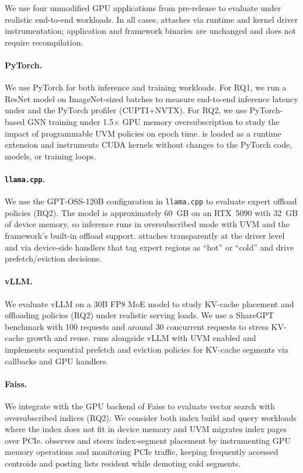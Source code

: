 We use four unmodified GPU applications from pre-release to evaluate \sys under realistic
end-to-end workloads. In all cases, \sys attaches via runtime and kernel driver
instrumentation; application and framework binaries are unchanged and does not require recompilation.

\paragraph{PyTorch.}
We use PyTorch for both inference and training workloads. For RQ1, we run a
ResNet model on ImageNet-sized batches to measure end-to-end inference latency
under \sys and the PyTorch profiler (CUPTI+NVTX). For RQ2, we use PyTorch-based
GNN training under 1.5$\times$ GPU memory oversubscription to study the impact
of programmable UVM policies on epoch time. \sys is loaded as a runtime
extension and instruments CUDA kernels without changes to the PyTorch code,
models, or training loops.

\paragraph{\texttt{llama.cpp}.}
We use the GPT-OSS-120B configuration in \texttt{llama.cpp} to evaluate expert
offload policies (RQ2). The model is approximately 60~GB on an RTX~5090 with
32~GB of device memory, so inference runs in oversubscribed mode with UVM and
the framework's built-in offload support. \sys attaches
transparently at the driver level and
via device-side handlers that tag expert regions as ``hot'' or ``cold'' and
drive prefetch/eviction decisions.

\paragraph{vLLM.}
We evaluate vLLM on a 30B FP8 MoE model to study KV-cache placement and
offloading policies (RQ2) under realistic serving loads. We use a ShareGPT
benchmark with 100 requests and around 30 concurrent requests to stress KV-cache
growth and reuse. \sys runs alongside vLLM with UVM enabled and implements
sequential prefetch and eviction policies for KV-cache segments via callbacks
and GPU handlers.

\paragraph{Faiss.}
We integrate \sys with the GPU backend of Faiss to evaluate vector search with
oversubscribed indices (RQ2). We consider both index build and query workloads
where the index does not fit in device memory and UVM migrates index pages over
PCIe. \sys observes and steers index-segment placement by instrumenting GPU
memory operations and monitoring PCIe traffic, keeping frequently accessed
centroids and posting lists resident while demoting cold segments.

